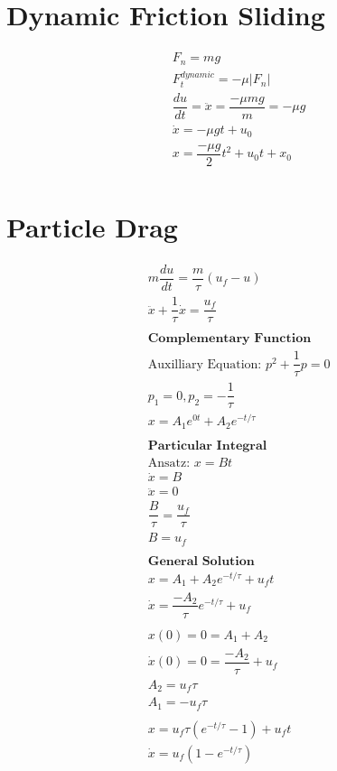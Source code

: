 \documentclass[a4paper,11pt,titlepage]{report}
\begin{document}
\section{Dynamic Friction Sliding}
\begin{align*}
&F_n = mg \\
&F_t^{dynamic} = - \mu |F_n| \\
&\dfrac{du}{dt} = \ddot{x} = \dfrac{- \mu m g}{m} = - \mu g\\
&\dot{x} = - \mu g t + u_0 \\
&x = \dfrac{- \mu g}{2}t^2 + u_0 t + x_0 \\
\end{align*}
\section{Particle Drag}
\label{der:drag}
\begin{align*}
&m\dfrac{du}{dt} = \dfrac{m}{\tau}(u_f - u) \\
&\ddot{x} + \dfrac{1}{\tau} \dot{x} = \dfrac{u_f}{\tau} \\\\
&\textbf{Complementary Function} \\
&\text{Auxilliary Equation: } p^2 + \dfrac{1}{\tau}p = 0 \\
&p_1 = 0, p_2 = - \dfrac{1}{\tau} \\
&x = A_1e^{0t} + A_2e^{-t/\tau} \\\\
&\textbf{Particular Integral} \\
&\text{Ansatz: } x = Bt \\
&\dot{x} = B \\
&\ddot{x} = 0 \\
&\dfrac{B}{\tau} = \dfrac{u_f}{\tau} \\
&B = u_f \\\\
&\textbf{General Solution} \\
&x = A_1 + A_2 e^{-t /\tau} + u_f t \\
&\dot{x} = \dfrac{-A_2}{\tau} e^{-t/\tau} + u_f \\\\
&x(0) = 0 = A_1 + A_2 \\
&\dot{x}(0) = 0 = \dfrac{-A_2}{\tau} + u_f \\
&A_2 = u_f \tau \\
&A_1 = - u_f \tau \\\\
&x = u_f \tau (e^{-t/\tau} - 1) + u_f t \\
&\dot{x} = u_f (1 - e^{-t/\tau}) \\
\end{align*}


\end{document}
